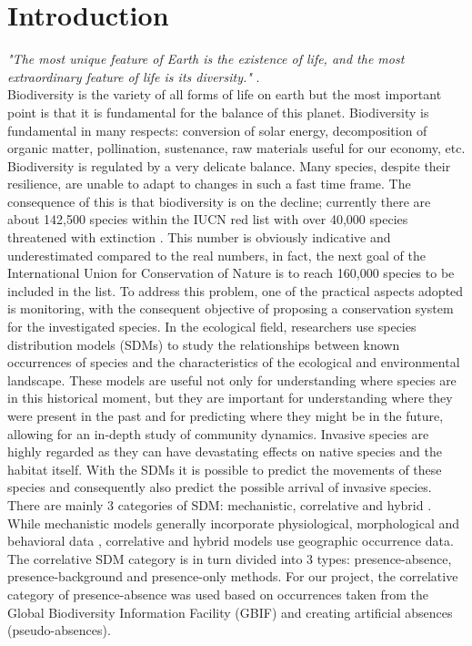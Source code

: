 \documentclass[12pt,a4paper]{article}
\begin{document}
\section{Introduction}
\textit{"The most unique feature of Earth is the existence of life, and the most extraordinary feature of life is its diversity."} \citep{cardinale}.\\
Biodiversity is the variety of all forms of life on earth but the most important point is that it is fundamental for the balance of this planet.
Biodiversity is fundamental in many respects: conversion of solar energy, decomposition of organic matter, pollination, sustenance, raw materials useful for our economy, etc.
Biodiversity is regulated by a very delicate balance.
Many species, despite their resilience, are unable to adapt to changes in such a fast time frame.
The consequence of this is that biodiversity is on the decline; currently there are about 142,500 species within the IUCN red list with over 40,000 species threatened with extinction \citep{IUCN}. This number is obviously indicative and underestimated compared to the real numbers, in fact, the next goal of the International Union for Conservation of Nature is to reach 160,000 species to be included in the list.
To address this problem, one of the practical aspects adopted is monitoring, with the consequent objective of proposing a conservation system for the investigated species.
In the ecological field, researchers use species distribution models (SDMs) to study the relationships between known occurrences of species and the characteristics of the ecological and environmental landscape.
These models are useful not only for understanding where species are in this historical moment, but they are important for understanding where they were present in the past and for predicting where they might be in the future, allowing for an in-depth study of community dynamics.
Invasive species are highly regarded as they can have devastating effects on native species and the habitat itself.
With the SDMs it is possible to predict the movements of these species and consequently also predict the possible arrival of invasive species.
There are mainly 3 categories of SDM: mechanistic, correlative and hybrid \citep{dor12}. While mechanistic models generally incorporate physiological, morphological and behavioral data \citep{kea}, correlative and hybrid models use geographic occurrence data.
The correlative SDM category is in turn divided into 3 types: presence-absence, presence-background and presence-only methods.
For our project, the correlative category of presence-absence was used based on occurrences taken from the Global Biodiversity Information Facility (GBIF) and creating artificial absences (pseudo-absences).
\end{document}
